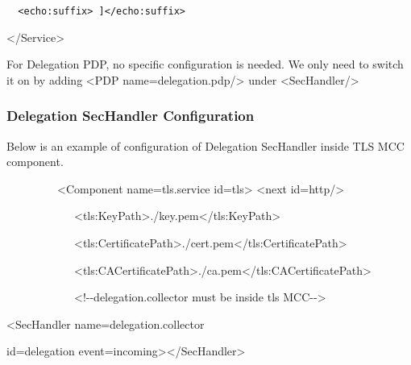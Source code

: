\documentclass{article}
\begin{document}
{\upshape\color{black}
\foreignlanguage{spanish}{\texttt{\ \ }}\foreignlanguage{spanish}{\texttt{{\textless}echo:suffix{\textgreater}
]{\textless}/echo:suffix{\textgreater}}}}

{\ttfamily\color{black}
{\textless}/Service{\textgreater}}

{\upshape\color{black}
For Delegation PDP, no specific configuration is needed. We only need to
switch it on by adding {\textless}PDP
name={\textquotedbl}delegation.pdp{\textquotedbl}/{\textgreater} under
{\textless}SecHandler/{\textgreater}}

\subsubsection[Delegation SecHandler Configuration]{Delegation
SecHandler Configuration}
{\upshape\color{black}
Below is an example of configuration of Delegation SecHandler inside TLS
MCC component.}

{\ttfamily\color{black}
\ \ \ \ \ \ \ \ \ {\textless}Component
name={\textquotedbl}tls.service{\textquotedbl}
id={\textquotedbl}tls{\textquotedbl}{\textgreater} {\textless}next
id={\textquotedbl}http{\textquotedbl}/{\textgreater}}

{\ttfamily\color{black}
\ \ \ \ \ \ \ \ \ \ \ \ {\textless}tls:KeyPath{\textgreater}./key.pem{\textless}/tls:KeyPath{\textgreater}}

{\ttfamily\color{black}
\ \ \ \ \ \ \ \ \ \ \ \ {\textless}tls:CertificatePath{\textgreater}./cert.pem{\textless}/tls:CertificatePath{\textgreater}}

{\ttfamily\color{black}
\ \ \ \ \ \ \ \ \ \ \ \ {\textless}tls:CACertificatePath{\textgreater}./ca.pem{\textless}/tls:CACertificatePath{\textgreater}}

{\ttfamily\color{black}
\ \ \ \ \ \ \ \ \ \ \ \ {\textless}!-{}-delegation.collector must be
inside tls MCC-{}-{\textgreater}}

{\ttfamily\color{black}
{\textless}SecHandler
name={\textquotedbl}delegation.collector{\textquotedbl} }

{\ttfamily\color{black}
id={\textquotedbl}delegation{\textquotedbl}
event={\textquotedbl}incoming{\textquotedbl}{\textgreater}{\textless}/SecHandler{\textgreater}}
\end{document}
